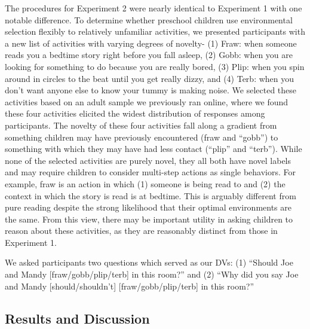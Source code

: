 \documentclass[10pt, letterpaper]{article}
\begin{document}
The procedures for Experiment 2 were nearly identical to Experiment 1
with one notable difference. To determine whether preschool children use
environmental selection flexibly to relatively unfamiliar activities, we
presented participants with a new list of activities with varying
degrees of novelty- (1) Fraw: when someone reads you a bedtime story
right before you fall asleep, (2) Gobb: when you are looking for
something to do because you are really bored, (3) Plip: when you spin
around in circles to the beat until you get really dizzy, and (4) Terb:
when you don't want anyone else to know your tummy is making noise. We
selected these activities based on an adult sample we previously ran
online, where we found these four activities elicited the widest
distribution of responses among participants. The novelty of these four
activities fall along a gradient from something children may have
previously encountered (fraw and ``gobb'') to something with which they
may have had less contact (``plip'' and ``terb''). While none of the
selected activities are purely novel, they all both have novel labels
and may require children to consider multi-step actions as single
behaviors. For example, fraw is an action in which (1) someone is being
read to and (2) the context in which the story is read is at bedtime.
This is arguably different from pure reading despite the strong
likelihood that their optimal environments are the same. From this view,
there may be important utility in asking children to reason about these
activities, as they are reasonably distinct from those in Experiment 1.

We asked participants two questions which served as our DVs: (1)
``Should Joe and Mandy {[}fraw/gobb/plip/terb{]} in this room?'' and (2)
``Why did you say Joe and Mandy {[}should/shouldn't{]}
{[}fraw/gobb/plip/terb{]} in this room?''

\hypertarget{results-and-discussion-1}{%
\subsection{Results and Discussion}\label{results-and-discussion-1}}
\end{document}
